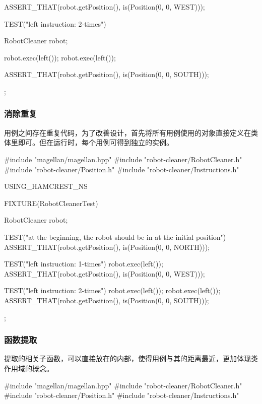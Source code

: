 \begin{content}
\begin{leftbar}
\begin{c++}[caption={test/robot-cleaner/RobotCleanerTest.cpp}]
{{        ASSERT_THAT(robot.getPosition(), is(Position(0, 0, WEST)));
    }

    TEST("left instruction: 2-times")
    {
        RobotCleaner robot;
        
        robot.exec(left());
        robot.exec(left());
        
        ASSERT_THAT(robot.getPosition(), is(Position(0, 0, SOUTH)));
    }
};
\end{c++}
\end{leftbar}

\subsubsection{消除重复}

用例之间存在重复代码，为了改善设计，首先将所有用例使用的对象直接定义在类体里即可。但在运行时，每个用例可得到独立的实例。

\begin{leftbar}
\begin{c++}[caption={test/robot-cleaner/RobotCleanerTest.cpp}]
#include "magellan/magellan.hpp"
#include "robot-cleaner/RobotCleaner.h"
#include "robot-cleaner/Position.h"
#include "robot-cleaner/Instructions.h"

USING_HAMCREST_NS

FIXTURE(RobotCleanerTest)
{
    RobotCleaner robot;

    TEST("at the beginning, the robot should be in at the initial position")
    {
        ASSERT_THAT(robot.getPosition(), is(Position(0, 0, NORTH)));
    }

    TEST("left instruction: 1-times")
    {
        robot.exec(left());        
        ASSERT_THAT(robot.getPosition(), is(Position(0, 0, WEST)));
    }

    TEST("left instruction: 2-times")
    {
        robot.exec(left());
        robot.exec(left());        
        ASSERT_THAT(robot.getPosition(), is(Position(0, 0, SOUTH)));
    }
};
\end{c++}
\end{leftbar}

\subsubsection{函数提取}

提取的相关子函数，可以直接放在的内部，使得用例与其的距离最近，更加体现类作用域的概念。

\begin{leftbar}
\begin{c++}[caption={test/robot-cleaner/RobotCleanerTest.cpp}]
#include "magellan/magellan.hpp"
#include "robot-cleaner/RobotCleaner.h"
#include "robot-cleaner/Position.h"
#include "robot-cleaner/Instructions.h"


\end{c++}
\end{leftbar}
\end{content}
